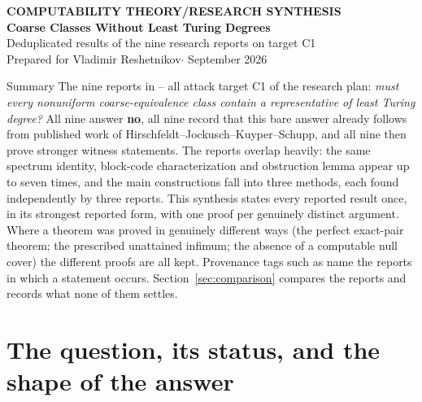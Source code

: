 \documentclass[11pt,letterpaper]{article}
\theoremstyle{definition}
\numberwithin{equation}{section}
\newcommand{\src}[1]{\leavevmode{\sffamily\footnotesize\color{Steel}[#1]}}
\begin{document}
\thispagestyle{plain}
\begin{center}
{\sffamily\small\bfseries\color{Steel}COMPUTABILITY THEORY\quad/\quad RESEARCH SYNTHESIS}\\[10pt]
{\fontsize{22}{27}\selectfont\bfseries\color{Navy}Coarse Classes Without Least Turing Degrees}\\[7pt]
{\large\color{Ink}Deduplicated results of the nine research reports on target C1}\\[9pt]
{\color{Muted}Prepared for Vladimir Reshetnikov\quad$\cdot$ September 2026}
\end{center}
\vspace{2pt}
\begin{assessment}{Summary}
The nine reports in -- all attack target C1 of the research plan: \emph{must every nonuniform coarse-equivalence class contain a representative of least Turing degree?} All nine answer \textbf{no}, all nine record that this bare answer already follows from published work of Hirschfeldt--Jockusch--Kuyper--Schupp, and all nine then prove stronger witness statements. The reports overlap heavily: the same spectrum identity, block-code characterization and obstruction lemma appear up to seven times, and the main constructions fall into three methods, each found independently by three reports. This synthesis states every reported result once, in its strongest reported form, with one proof per genuinely distinct argument. Where a theorem was proved in genuinely different ways (the perfect exact-pair theorem; the prescribed unattained infimum; the absence of a computable null cover) the different proofs are all kept. Provenance tags such as \src{R1, R8} name the reports in which a statement occurs. Section~\ref{sec:comparison} compares the reports and records what none of them settles.
\end{assessment}
{\small\tableofcontents}

\section{The question, its status, and the shape of the answer}\label{sec:overview}
\end{document}
